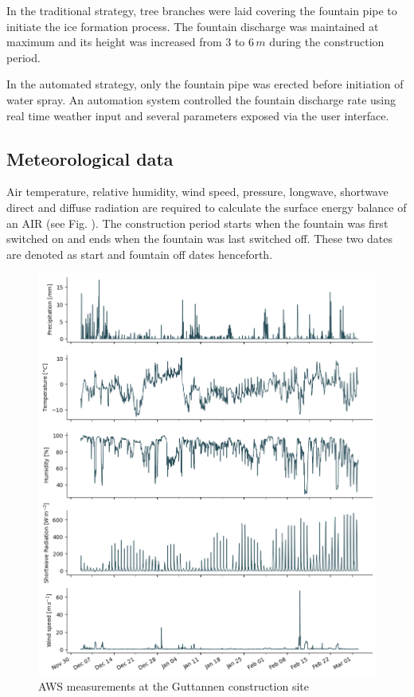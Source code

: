 \documentclass[tc, manuscript]{copernicus}
\begin{document}
In the traditional strategy, tree branches were laid covering the fountain pipe to initiate the ice formation
process. The fountain discharge was maintained at maximum and its height was increased from 3 to 6\,$m$ during
the construction period.

In the automated strategy, only the fountain pipe was erected before initiation of water spray. An automation
system controlled the fountain discharge rate using real time weather input and several parameters exposed via
the user interface. 

\subsection{Meteorological data}
Air temperature, relative humidity, wind speed, pressure, longwave, shortwave direct and diffuse radiation are
required to calculate the surface energy balance of an AIR (see Fig. ). The construction period starts when the
fountain was first switched on and ends when the fountain was last switched off. These two dates are denoted as
start and fountain off dates henceforth.

\begin{figure}[t]
\includegraphics[width=12cm]{Figures/input.png}
\caption{AWS measurements at the Guttannen construction site}
\label{fig:aws} 
\end{figure}
\end{document}
